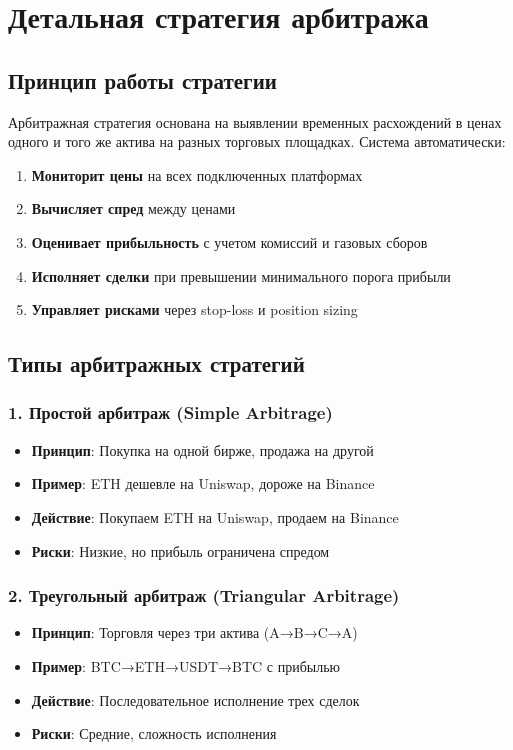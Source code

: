 \documentclass[a4paper,11pt]{article}
\begin{document}
\newpage

\section{Детальная стратегия арбитража}

\subsection{Принцип работы стратегии}

Арбитражная стратегия основана на выявлении временных расхождений в ценах одного и того же актива на разных торговых площадках. Система автоматически:

\begin{enumerate}
    \item \textbf{Мониторит цены} на всех подключенных платформах
    \item \textbf{Вычисляет спред} между ценами
    \item \textbf{Оценивает прибыльность} с учетом комиссий и газовых сборов
    \item \textbf{Исполняет сделки} при превышении минимального порога прибыли
    \item \textbf{Управляет рисками} через stop-loss и position sizing
\end{enumerate}

\subsection{Типы арбитражных стратегий}

\subsubsection{1. Простой арбитраж (Simple Arbitrage)}
\begin{itemize}
    \item \textbf{Принцип}: Покупка на одной бирже, продажа на другой
    \item \textbf{Пример}: ETH дешевле на Uniswap, дороже на Binance
    \item \textbf{Действие}: Покупаем ETH на Uniswap, продаем на Binance
    \item \textbf{Риски}: Низкие, но прибыль ограничена спредом
\end{itemize}

\subsubsection{2. Треугольный арбитраж (Triangular Arbitrage)}
\begin{itemize}
    \item \textbf{Принцип}: Торговля через три актива (A→B→C→A)
    \item \textbf{Пример}: BTC→ETH→USDT→BTC с прибылью
    \item \textbf{Действие}: Последовательное исполнение трех сделок
    \item \textbf{Риски}: Средние, сложность исполнения
\end{itemize}
\end{document}
